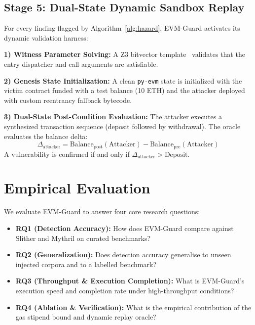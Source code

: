 \documentclass[conference]{IEEEtran}
\begin{document}
\subsection{Stage 5: Dual-State Dynamic Sandbox Replay}
For every finding flagged by Algorithm~\ref{alg:hazard}, EVM-Guard activates its dynamic validation harness:

\smallskip
\noindent\textbf{1) Witness Parameter Solving:} A Z3 bitvector template~\cite{de2008z3} validates that the entry dispatcher and call arguments are satisfiable.

\smallskip
\noindent\textbf{2) Genesis State Initialization:} A clean \texttt{py-evm} state is initialized with the victim contract funded with a test balance (10 ETH) and the attacker deployed with custom reentrancy fallback bytecode.

\smallskip
\noindent\textbf{3) Dual-State Post-Condition Evaluation:} The attacker executes a synthesized transaction sequence (deposit followed by withdrawal). The oracle evaluates the balance delta:
\begin{equation}
\Delta_{\mathrm{attacker}} = \mathrm{Balance}_{\mathrm{post}}(\mathrm{Attacker}) - \mathrm{Balance}_{\mathrm{pre}}(\mathrm{Attacker})
\end{equation}
A vulnerability is confirmed if and only if $\Delta_{\mathrm{attacker}} > \mathrm{Deposit}$.

\section{Empirical Evaluation}\label{sec:eval}

We evaluate EVM-Guard to answer four core research questions:
\begin{itemize}
    \item \textbf{RQ1 (Detection Accuracy):} How does EVM-Guard compare against Slither and Mythril on curated benchmarks?
    \item \textbf{RQ2 (Generalization):} Does detection accuracy generalise to unseen injected corpora and to a labelled benchmark?
    \item \textbf{RQ3 (Throughput \& Execution Completion):} What is EVM-Guard's execution speed and completion rate under high-throughput conditions?
    \item \textbf{RQ4 (Ablation \& Verification):} What is the empirical contribution of the gas stipend bound and dynamic replay oracle?
\end{itemize}
\end{document}
